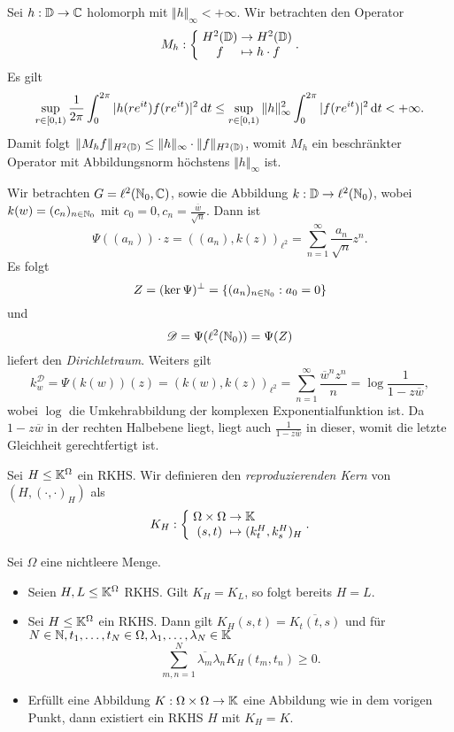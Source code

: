 \begin{remark}
    Sei $h : \mathbb{D} \to \mathbb{C}$ holomorph mit $ \Vert h \Vert_\infty < +\infty $. Wir betrachten den Operator
    $$ \mapping{M_h}{H^2(\D) & \to & H^2(\D)}{f & \mapsto & h \cdot f}. $$
    Es gilt
    $$ \sup_{r \in [0, 1)} \frac{1}{2 \pi} \int_0^{2 \pi} \vert h(re^{it}) f(re^{it}) \vert^2 \mathop{}\!\mathrm{d} t \leq \sup_{r \in [0, 1)} \Vert h \Vert_\infty^2 \int_0^{2 \pi} \vert f(re^{it}) \vert^2 \mathop{}\!\mathrm{d} t < +\infty. $$
    Damit folgt $ \Vert M_h f \Vert_{H^2(\mathbb{D})} \leq \Vert h \Vert_\infty \cdot \Vert f \Vert_{H^2(\mathbb{D})} $, womit $M_h$ ein beschränkter Operator mit Abbildungsnorm höchstens $\Vert h \Vert_\infty$ ist.
\end{remark}

\begin{example}
    Wir betrachten $G = \ell^2(\mathbb{N}_0, \mathbb{C})$, sowie die Abbildung $k : \mathbb{D} \to \ell^2(\mathbb{N}_0)$, wobei $k(w) = (c_n)_{n \in \mathbb{N}_0}$ mit $c_0 = 0, c_n = \frac{\overline{w}}{\sqrt{n}}$. Dann ist
    $$ \Psi((a_n)) \cdot z = ((a_n), k(z))_{\ell^2} = \sum_{n=1}^\infty \frac{a_n}{\sqrt{n}} z^n. $$
    Es folgt
    $$ Z = (\ker \Psi)^\perp = \{ (a_n)_{n \in \mathbb{N}_0} : a_0 = 0 \} $$
    und
    $$ \mathscr{D} = \Psi(\ell^2(\mathbb{N}_0)) = \Psi(Z) $$
    liefert den \emph{Dirichletraum}. Weiters gilt
    $$ k_w^\mathscr{D} = \Psi(k(w))(z) = (k(w), k(z))_{\ell^2} = \sum_{n=1}^\infty \frac{\overline{w}^n z^n}{n} = \log \frac{1}{1 - z \overline{w}}, $$
    wobei $\log$ die Umkehrabbildung der komplexen Exponentialfunktion ist. Da $1 - z \overline{w}$ in der rechten Halbebene liegt, liegt auch $\frac{1}{1 - z\overline{w}}$ in dieser, womit die letzte Gleichheit gerechtfertigt ist. 
\end{example}

\begin{definition}
    Sei $H \leq \mathbb{K}^\Omega$ ein RKHS. Wir definieren den \emph{reproduzierenden Kern} von $(H, (\cdot, \cdot)_H)$ als
    $$ \mapping{K_H}{\Omega \times \Omega & \to & \K}{(s, t) & \mapsto & (k_t^H, k_s^H)_H}. $$
\end{definition}

\begin{theorem}
    Sei $\Omega$ eine nichtleere Menge.
    \begin{itemize}
        \item Seien $H, L \leq \mathbb{K}^\Omega$ RKHS. Gilt $K_H = K_L$, so folgt bereits $H = L$.
        \item Sei $H \leq \mathbb{K}^\Omega$ ein RKHS. Dann gilt $K_H(s, t) = \overline{K_t(t, s)}$ und für $N \in \mathbb{N}, t_1, \hdots, t_N \in \Omega, \lambda_1, \hdots, \lambda_N \in \mathbb{K}$
        $$ \sum_{m,n=1}^N \overline{\lambda_m} \lambda_n K_H(t_m, t_n) \geq 0. $$
        \item Erfüllt eine Abbildung $K : \Omega \times \Omega \to \mathbb{K}$ eine Abbildung wie in dem vorigen Punkt, dann existiert ein RKHS $H$ mit $K_H = K$.
    \end{itemize}
\end{theorem}

